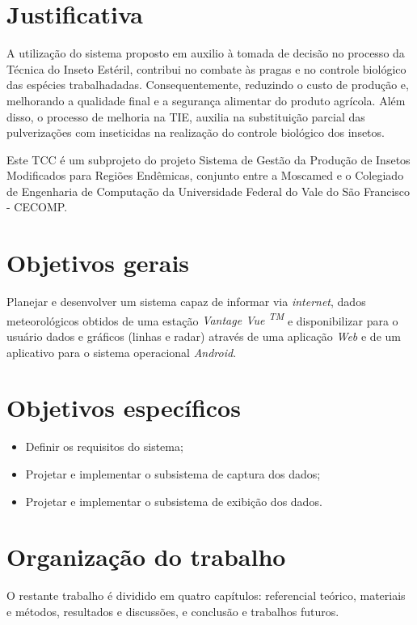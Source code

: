 \section{Justificativa}

A utilização do sistema proposto em auxilio à tomada de decisão no processo da Técnica do Inseto Estéril, contribui no combate às pragas e no controle biológico das espécies trabalhadadas. Consequentemente, reduzindo o custo de produção e, melhorando a qualidade final e a segurança alimentar do produto agrícola. Além disso, o processo de melhoria na TIE, auxilia na substituição parcial das pulverizações com inseticidas na realização do controle biológico dos insetos.
  
Este TCC é um subprojeto do projeto Sistema de Gestão da Produção de Insetos Modificados para Regiões Endêmicas, conjunto entre a Moscamed e o Colegiado de Engenharia de Computação da Universidade Federal do Vale do São Francisco - CECOMP.


\section{Objetivos gerais}

Planejar e desenvolver um sistema capaz de informar via \textit{internet}, dados meteorológicos obtidos de uma estação \textit{Vantage Vue \textsuperscript{TM}} e disponibilizar para o usuário dados e gráficos (linhas e radar) através de uma aplicação \textit{Web} e de um aplicativo para o sistema operacional \textit{Android}.

\section{Objetivos específicos}

\begin{itemize}
	\item Definir os requisitos do sistema;
    \item Projetar e implementar o subsistema de captura dos dados;
    \item Projetar e implementar o subsistema de exibição dos dados.

\end{itemize}

\section{Organização do trabalho}

O restante trabalho é dividido em quatro capítulos: referencial teórico, materiais e métodos, resultados e discussões, e conclusão e trabalhos futuros.

